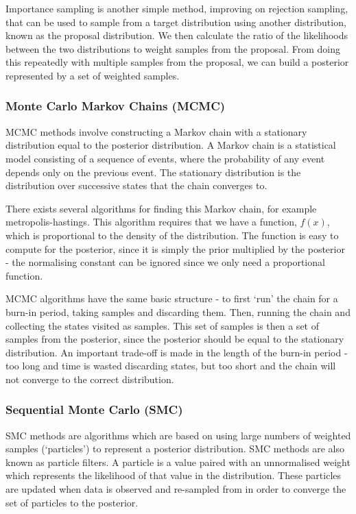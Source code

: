 Importance sampling is another simple method, improving on rejection sampling, that can be used to sample from a target distribution using another distribution, known as the proposal distribution. We then calculate the ratio of the likelihoods between the two distributions to weight samples from the proposal. From doing this repeatedly with multiple samples from the proposal, we can build a posterior represented by a set of weighted samples.
			
			
\subsubsection{Monte Carlo Markov Chains (MCMC)}
	
MCMC methods involve constructing a Markov chain with a stationary distribution equal to the posterior distribution. A Markov chain is a statistical model consisting of a sequence of events, where the probability of any event depends only on the previous event. The stationary distribution is the distribution over successive states that the chain converges to.
	
There exists several algorithms for finding this Markov chain, for example metropolis-hastings. This algorithm requires that we have a function, $f(x)$, which is proportional to the density of the distribution. The function is easy to compute for the posterior, since it is simply the prior multiplied by the posterior - the normalising constant can be ignored since we only need a proportional function.
	
MCMC algorithms have the same basic structure - to first `run' the chain for a burn-in period, taking samples and discarding them. Then, running the chain and collecting the states visited as samples. This set of samples is then a set of samples from the posterior, since the posterior should be equal to the stationary distribution. An important trade-off is made in the length of the burn-in period - too long and time is wasted discarding states, but too short and the chain will not converge to the correct distribution.

\subsubsection{Sequential Monte Carlo (SMC)}

SMC methods are algorithms which are based on using large numbers of weighted samples (`particles') to represent a posterior distribution. SMC methods are also known as particle filters. A particle is a value paired with an unnormalised weight which represents the likelihood of that value in the distribution. These particles are updated when data is observed and re-sampled from in order to converge the set of particles to the posterior.

